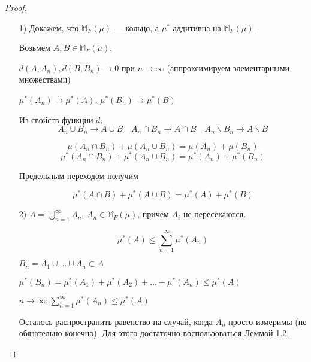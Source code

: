 \begin{proof}
  \phantom{}\par
  \begin{itemize}
  \item[1)] Докажем, что $\mathbb{M}_F(\mu)$ --- кольцо, а $\mu^*$ аддитивна на $\mathbb{M}_F(\mu)$.

  Возьмем $A, B \in \mathbb{M}_F(\mu)$.

  $d(A, A_n), d(B, B_n) \to 0$ при $ n\to \infty$ (аппроксимируем элементарными множествами)

  $\mu^*(A_n) \to \mu^*(A)$, $\mu^*(B_n) \to \mu^*(B)$

  Из свойств функции $d$:
  $$A_n \cup B_n \to A\cup B \quad A_n \cap B_n \to A\cap B \quad A_n \backslash B_n \to A\backslash B$$

  $$\mu(A_n \cap B_n) + \mu(A_n \cup B_n) = \mu(A_n) + \mu(B_n)$$
  $$\mu^*(A_n \cap B_n) + \mu^*(A_n \cup B_n) = \mu^*(A_n) + \mu^*(B_n)$$

  Предельным переходом получим

  $$\mu^*(A \cap B) + \mu^*(A \cup B) = \mu^*(A) + \mu^*(B)$$

  \item[2)] $A = \bigcup_{n =1}^{\infty} A_n$, $A_n \in \mathbb{M}_F(\mu)$, причем $A_i$ не пересекаются.

  $$\mu^*(A) \leq \sum_{n = 1}^{\infty} \mu^*(A_n)$$

  $B_n = A_1 \cup \ldots \cup A_n \subset A$

  $\mu^*(B_n) = \mu^*(A_1) + \mu^*(A_2) + \ldots + \mu^*(A_n) \leq \mu^*(A)$

  $n \to \infty: \sum_{n=1}^{\infty} \mu^*(A_n) \leq \mu^*(A)$

  Осталось распространить равенство на случай, когда $A_n$ просто измеримы (не обязательно конечно). 
  Для этого достаточно воспользоваться \hyperlink{Lemma1}{Леммой 1.2.}
  \end{itemize}
\end{proof}